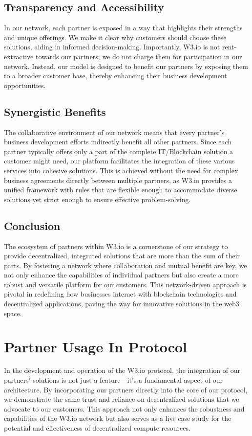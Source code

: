 \documentclass[11pt]{article}
\begin{document}
\subsection{Transparency and Accessibility}
In our network, each partner is exposed in a way that highlights their strengths and unique offerings. We make it clear why customers should choose these solutions, aiding in informed decision-making. Importantly, W3.io is not rent-extractive towards our partners; we do not charge them for participation in our network. Instead, our model is designed to benefit our partners by exposing them to a broader customer base, thereby enhancing their business development opportunities.

\subsection{Synergistic Benefits}
The collaborative environment of our network means that every partner's business development efforts indirectly benefit all other partners. Since each partner typically offers only a part of the complete IT/Blockchain solution a customer might need, our platform facilitates the integration of these various services into cohesive solutions. This is achieved without the need for complex business agreements directly between multiple partners, as W3.io provides a unified framework with rules that are flexible enough to accommodate diverse solutions yet strict enough to ensure effective problem-solving.

\subsection{Conclusion}
The ecosystem of partners within W3.io is a cornerstone of our strategy to provide decentralized, integrated solutions that are more than the sum of their parts. By fostering a network where collaboration and mutual benefit are key, we not only enhance the capabilities of individual partners but also create a more robust and versatile platform for our customers. This network-driven approach is pivotal in redefining how businesses interact with blockchain technologies and decentralized applications, paving the way for innovative solutions in the web3 space. 


\section{Partner Usage In Protocol}
In the development and operation of the W3.io protocol, the integration of our partners' solutions is not just a feature---it's a fundamental aspect of our architecture. By incorporating our partners directly into the core of our protocol, we demonstrate the same trust and reliance on decentralized solutions that we advocate to our customers. This approach not only enhances the robustness and capabilities of the W3.io network but also serves as a live case study for the potential and effectiveness of decentralized compute resources.
\end{document}

